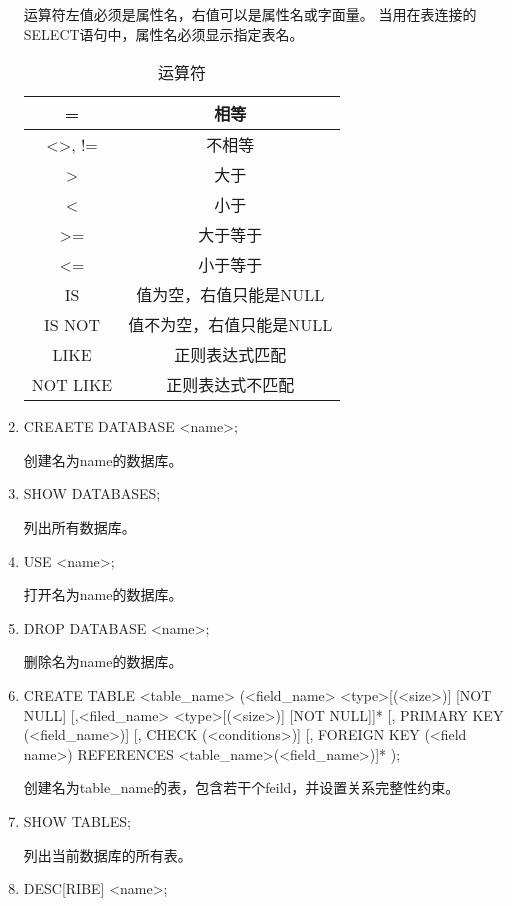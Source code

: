 \begin{enumerate}
    运算符左值必须是属性名，右值可以是属性名或字面量。%
    当用在表连接的SELECT语句中，属性名必须显示指定表名。
    
    \begin{table}[!hbp]
        \centering
        \caption{运算符}
        \begin{tabular}{|c|c|}
        \hline
        = & 相等 \\
        \hline
        <>, != & 不相等 \\
        \hline
        > & 大于 \\
        \hline
        < & 小于 \\
        \hline
        >= & 大于等于 \\
        \hline
        <= & 小于等于 \\
        \hline
        IS & 值为空，右值只能是NULL \\
        \hline
        IS NOT & 值不为空，右值只能是NULL \\
        \hline
        LIKE & 正则表达式匹配 \\
        \hline
        NOT LIKE &  正则表达式不匹配 \\
        \hline
        \end{tabular}
    \end{table}
    \item
    CREAETE DATABASE <name>;

    创建名为name的数据库。
    \item
    SHOW DATABASES;

    列出所有数据库。
    \item
    USE <name>;

    打开名为name的数据库。
    \item
    DROP DATABASE <name>;

    删除名为name的数据库。
    \item
    CREATE TABLE <table\_name> (<field\_name> <type>[(<size>)] [NOT NULL] 
                         [,<filed\_name> <type>[(<size>)] [NOT NULL]]* 
                         [, PRIMARY KEY (<field\_name>)]
                         [, CHECK (<conditions>)]
                         [, FOREIGN KEY (<field name>) REFERENCES <table\_name>(<field\_name>)]*
                         );

    创建名为table\_name的表，包含若干个feild，并设置关系完整性约束。
    \item
    SHOW TABLES;

    列出当前数据库的所有表。
    \item
    DESC[RIBE] <name>;
    

\end{enumerate}
